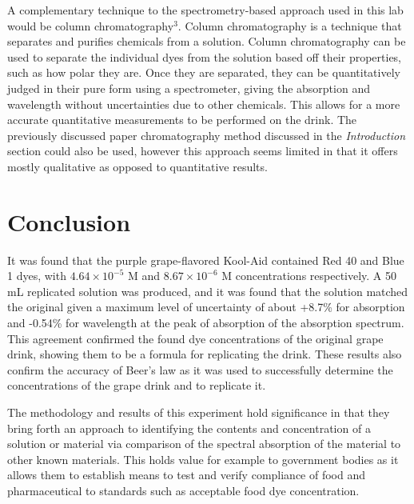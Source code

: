 \documentclass[12pt]{article}
\begin{document}
A complementary technique to the spectrometry-based approach used in this lab would be column chromatography$^{3}$. Column chromatography is a technique that separates and purifies chemicals from a solution. Column chromatography can be used to separate the individual dyes from the solution based off their properties, such as how polar they are. Once they are separated, they can be quantitatively judged in their pure form using a spectrometer, giving the absorption and wavelength without uncertainties due to other chemicals. This allows for a more accurate quantitative measurements to be performed on the drink. The previously discussed paper chromatography method discussed in the \textit{Introduction} section could also be used, however this approach seems limited in that it offers mostly qualitative as opposed to quantitative results.
\section{Conclusion}
It was found that the purple grape-flavored Kool-Aid contained Red 40 and Blue 1 dyes, with $4.64 \times 10^{-5}$ M and $8.67 \times 10^{-6}$ M concentrations respectively. A 50 mL replicated solution was produced, and it was found that the solution matched the original given a maximum level of uncertainty of about +8.7\% for absorption and -0.54\% for wavelength at the peak of absorption of the absorption spectrum. This agreement confirmed the found dye concentrations of the original grape drink, showing them to be a formula for replicating the drink. These results also confirm the accuracy of Beer's law as it was used to successfully determine the concentrations of the grape drink and to replicate it.\par
\vspace{6pt}
The methodology and results of this experiment hold significance in that they bring forth an approach to identifying the contents and concentration of a solution or material via comparison of the spectral absorption of the material to other known materials. This holds value for example to government bodies as it allows them to establish means to test and verify compliance of food and pharmaceutical to standards such as acceptable food dye concentration.
\end{document}
